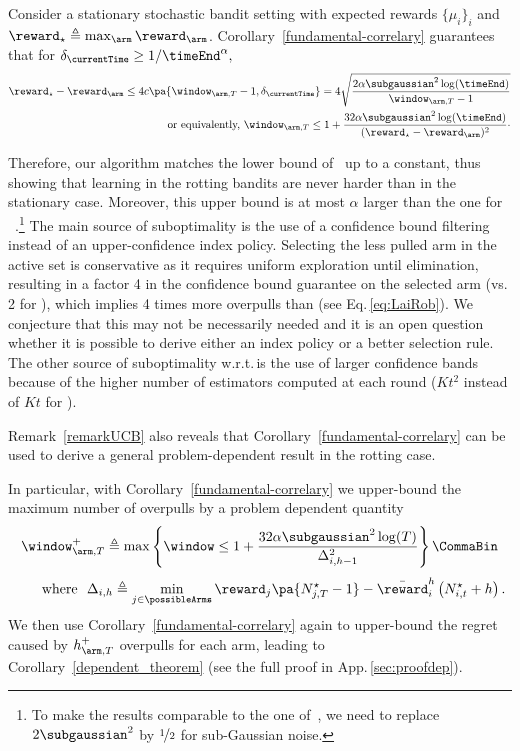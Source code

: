 \begin{remark}\label{remarkUCB}
Consider a stationary stochastic bandit setting with expected rewards $\{\mu_i\}_i$ and $\reward_\star \triangleq \max_\arm \reward_\arm$. Corollary~\ref{fundamental-correlary} guarantees that for $\delta_\currentTime \geq 1/\timeEnd^\alpha,$ 
\begin{align}
\reward_\star - \reward_\arm \leq 4c\pa{\window_{\arm,T}-1,  \delta_\currentTime} = 4\sqrt{\frac{2\alpha\subgaussian^2 \log(\timeEnd)}{\window_{\arm,T} -1}}
\nonumber\\
\text{\ or equivalently,\ }
\label{eq:LaiRob}
\window_{\arm,T} \leq 1+ \frac{32\alpha \subgaussian^2 \log(\timeEnd)}{(\reward_{\star} - \reward_\arm) ^2}\cdot
\end{align}
\end{remark}
Therefore, our algorithm matches the lower bound of~\citet{lai1985asymptotically} up to a constant, thus showing that learning in the rotting bandits are never harder than in the stationary case. Moreover, this upper bound is at most $\alpha$ larger than the one for \UCBone~\citep{auer2002finite}.\footnote{To make the results comparable to the one of~\citet{auer2002finite}, we need to replace $2\subgaussian^2$ by $\nicefrac{1}{2}$ for sub-Gaussian noise.} The main source of suboptimality is the use of a confidence bound filtering instead of an upper-confidence index policy. Selecting the less pulled arm in the active set is conservative as it requires uniform exploration until elimination, resulting in a factor 4 in the confidence bound guarantee on the selected arm (vs.\,2 for \UCB), which implies 4 times more overpulls than \UCB (see Eq.\,\ref{eq:LaiRob}). We conjecture that this may not be necessarily needed and it is an open question whether it is possible to derive either an index policy or a better selection rule. The other source of suboptimality w.r.t.\,\UCB is the use of larger confidence bands because of the higher number of estimators computed at each round ($Kt^2$ instead of $Kt$ for \UCB).


Remark~\ref{remarkUCB} also reveals that Corollary~\ref{fundamental-correlary} can be used to derive a general problem-dependent result in the rotting case.

In particular, with Corollary~\ref{fundamental-correlary} we upper-bound 
the maximum number of overpulls by a problem dependent quantity
\begin{equation}
\label{eq:hit+}
\window_{\arm,T}^+ \triangleq \max \left\{ \window \leq 
1 + \frac{32\alpha \subgaussian^2 \log(T)}{\Delta_{i,h-1}^2} \right\}\CommaBin
\end{equation}
\[
\text{\qquad where \ } \Delta_{i,h} \triangleq \min_{j \in \possibleArms} \reward_j\pa{N_{j,T}^\star -1} - \bar{\reward}_i^h\left( N_{i,t}^\star+h \right).
\]
We then use Corollary~\ref{fundamental-correlary} again to upper-bound the regret caused by $h_{\arm,T}^+$ overpulls for each arm, leading to Corollary~\ref{dependent_theorem} (see the full proof in App.\,\ref{sec:proofdep}). 

